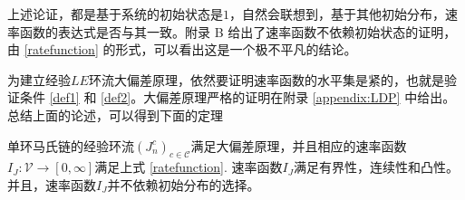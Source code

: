 上述论证，都是基于系统的初始状态是$1$，自然会联想到，基于其他初始分布，速率函数的表达式是否与其一致。附录 B 给出了速率函数不依赖初始状态的证明，由 \eqref{ratefunction} 的形式，可以看出这是一个极不平凡的结论。

为建立经验$LE$环流大偏差原理，依然要证明速率函数的水平集是紧的，也就是验证条件 \eqref{def1} 和 \eqref{def2}。大偏差原理严格的证明在附录 \ref{appendix:LDP} 中给出。总结上面的论述，可以得到下面的定理

\begin{theorem}\label{thm:LDP}
    单环马氏链的经验环流$(J^c_n)_{c\in\mathcal{C}}$满足大偏差原理，并且相应的速率函数$I_J:\mathcal{V}\to [0,\infty]$满足上式 \eqref{ratefunction}. 速率函数$I_J$满足有界性，连续性和凸性。并且，速率函数$I_J$并不依赖初始分布的选择。
\end{theorem}

